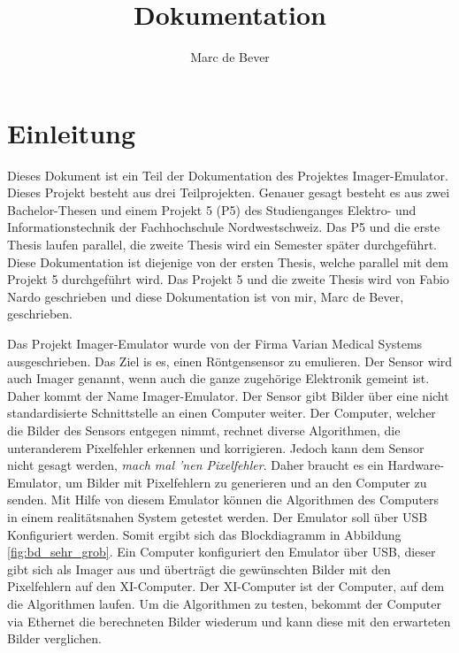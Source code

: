 \documentclass{article}
\title{Dokumentation}
\author{Marc de Bever}
\begin{document}
\maketitle
\tableofcontents

\section{Einleitung}
Dieses Dokument ist ein Teil der Dokumentation des Projektes Imager-Emu\-lator. Dieses Projekt besteht aus drei Teilprojekten. 
Genauer gesagt besteht es aus zwei Bachelor-Thesen und einem Projekt 5 (P5) des Studienganges Elektro- und Informationstechnik der Fachhochschule Nordwestschweiz. 
Das P5 und die erste Thesis laufen parallel, die zweite Thesis wird ein Semester später durchgeführt. Diese Dokumentation ist diejenige von der ersten Thesis, welche parallel mit dem Projekt 5 durchgeführt wird. Das Projekt 5 und die zweite Thesis wird von Fabio Nardo geschrieben und diese Dokumentation ist von mir, Marc de Bever, geschrieben. 

Das Projekt Imager-Emulator wurde von der Firma Varian Medical Systems ausgeschrieben. Das Ziel is es, einen Röntgensensor zu emulieren. Der Sensor wird auch Imager genannt, wenn auch die ganze zugehörige Elektronik gemeint ist. Daher kommt der Name Imager-Emulator. Der Sensor gibt Bilder über eine nicht standardisierte Schnittstelle an einen Computer weiter. Der Computer, welcher die Bilder des Sensors entgegen nimmt, rechnet diverse Algorithmen, die unteranderem Pixelfehler erkennen und korrigieren. Jedoch kann dem Sensor nicht gesagt werden, \textit{mach mal 'nen Pixelfehler}. Daher braucht es ein Hardware-Emulator, um Bilder mit Pixelfehlern zu generieren und an den Computer zu senden. Mit Hilfe von diesem Emulator können die Algorithmen des Computers in einem realitätsnahen System getestet werden. Der Emulator soll über USB Konfiguriert werden. Somit ergibt sich das Blockdiagramm in Abbildung \ref{fig:bd_sehr_grob}. Ein Computer konfiguriert den Emulator über USB, dieser gibt sich als Imager aus und überträgt die gewünschten Bilder mit den Pixelfehlern auf den XI-Computer. Der XI-Computer ist der Computer, auf dem die Algorithmen laufen. Um die Algorithmen zu testen, bekommt der Computer via Ethernet die berechneten Bilder wiederum  und kann diese mit den erwarteten Bilder verglichen.
\end{document}
